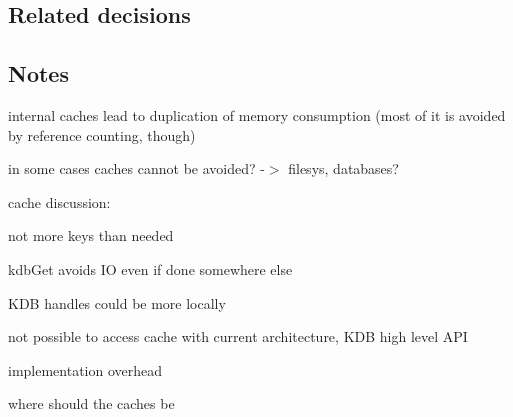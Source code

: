 \subsection*{Related decisions}

\subsection*{Notes}

internal caches lead to duplication of memory consumption (most of it is avoided by reference counting, though)

in some cases caches cannot be avoided? -\/$>$ filesys, databases?

cache discussion\+:
\begin{DoxyItemize}
\item not more keys than needed
\item kdb\+Get avoids I\+O even if done somewhere else
\item K\+D\+B handles could be more locally
\item not possible to access cache with current architecture, K\+D\+B high level A\+P\+I
\item implementation overhead
\item where should the caches be 
\end{DoxyItemize}